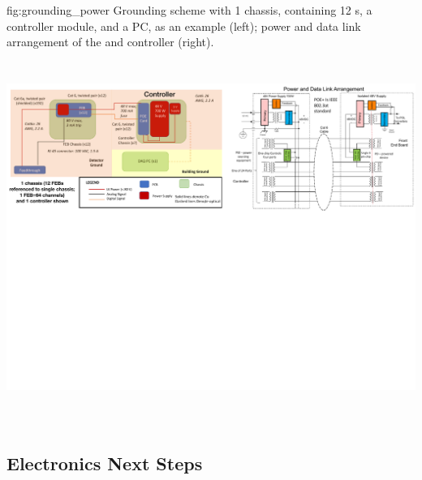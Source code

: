\begin{dunefigure}
 {fig:grounding_power}
 {Grounding scheme with 1 chassis, containing 12 s, a controller module, and a  PC, as an example (left); power and data link arrangement of the  and controller (right).}
\includegraphics[height=4.8in]{graphics/pds-grounding-power.pdf} 
\vspace{-7.1cm}
\end{dunefigure}



\subsection{Electronics Next Steps}
\label{subsec:pds-fe-next}

